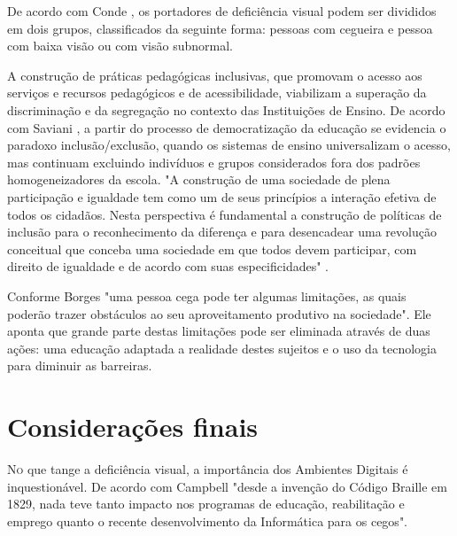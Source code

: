 De acordo com Conde \cite{conde2007definindo}, os portadores de deficiência visual podem ser divididos em dois grupos, classificados da seguinte forma: pessoas com cegueira e pessoa com baixa visão ou com visão subnormal.

A construção de práticas pedagógicas inclusivas, que promovam o acesso aos serviços e recursos pedagógicos e de acessibilidade, viabilizam a superação da discriminação e da segregação no contexto das Instituições de Ensino. De acordo com Saviani \cite{saviani2003pedagogia}, a partir do processo de democratização da educação se evidencia o paradoxo inclusão/exclusão, quando os sistemas de ensino universalizam o acesso, mas continuam excluindo indivíduos e grupos considerados fora dos padrões homogeneizadores da escola. "A construção de uma sociedade de plena participação e igualdade tem como um de seus princípios a interação efetiva de todos os cidadãos. Nesta perspectiva é fundamental a construção de políticas de inclusão para o reconhecimento da diferença e para desencadear uma revolução conceitual que conceba uma sociedade em que todos devem participar, com direito de igualdade e de acordo com suas especificidades" \cite{conforto2002acessibilidade}.

Conforme Borges \cite{borges1996dosvox} "uma pessoa cega pode ter algumas limitações, as quais poderão trazer obstáculos ao seu aproveitamento produtivo na sociedade". Ele aponta que grande parte destas limitações pode ser eliminada através de duas ações: uma educação adaptada a realidade destes sujeitos e o uso da tecnologia para diminuir as barreiras.

\section{Considerações finais}
\lettrine{N}{o} que tange a deficiência visual, a importância dos Ambientes Digitais é inquestionável. De acordo com Campbell \cite{campbell2001trabalho} "desde a invenção do Código Braille em 1829, nada teve tanto impacto nos programas de educação, reabilitação e emprego quanto o recente desenvolvimento da Informática para os cegos".